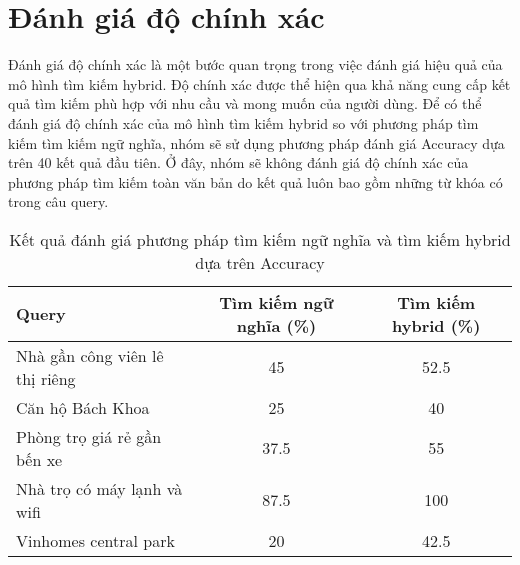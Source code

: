 \section{Đánh giá độ chính xác}
\hspace*{1cm}Đánh giá độ chính xác là một bước quan trọng trong việc đánh giá hiệu quả của mô hình tìm kiếm hybrid. Độ chính xác được thể hiện qua khả năng cung cấp kết quả tìm kiếm phù hợp với nhu cầu và mong muốn của người dùng. Để có thể đánh giá độ chính xác của mô hình tìm kiếm hybrid so với phương pháp tìm kiếm tìm kiếm ngữ nghĩa, nhóm sẽ sử dụng phương pháp đánh giá Accuracy dựa trên 40 kết quả đầu tiên. Ở đây, nhóm sẽ không đánh giá độ chính xác của phương pháp tìm kiếm toàn văn bản do kết quả luôn bao gồm những từ khóa có trong câu query.
\begin{table}[H]
    \centering
        \caption{Kết quả đánh giá phương pháp tìm kiếm ngữ nghĩa và tìm kiếm hybrid dựa trên Accuracy}
    \begin{tabular}{|l|c|c|}
    \hline
        Query &  Tìm kiếm ngữ nghĩa (\%) & \textbf{Tìm kiếm hybrid (\%)} \\
        \hline
        \hline
        Nhà gần công viên lê thị riêng &  45 & 52.5 \\
        Căn hộ Bách Khoa & 25 & 40 \\
        Phòng trọ giá rẻ gần bến xe & 37.5 & 55 \\
        Nhà trọ có máy lạnh và wifi & 87.5 & 100 \\
        Vinhomes central park & 20 & 42.5 \\
\hline
    \end{tabular}
    \label{tab:results_accuracy}
\end{table}

